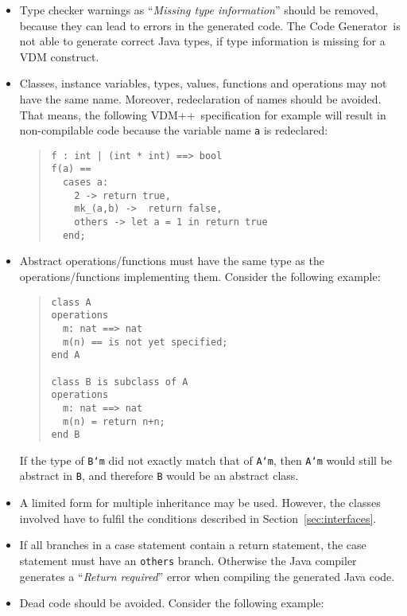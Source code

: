 \documentclass[\pformat,11pt]{article}
\newcommand{\Tcg}{The Code Generator}
\newcommand{\VDM}{VDM++}
\begin{document}
\begin{itemize}
\item Type checker warnings as ``{\em Missing type information}'' should
  be removed, because they can lead to errors in the generated code.
  \Tcg\ is not able to generate correct Java types, if type information is
  missing for a VDM construct.

\item Classes, instance variables, types, values, functions and operations may not have the same name.
Moreover, redeclaration of names should be avoided. That means, the following \VDM\ specification for example will result in non-compilable code because the variable name {\tt a} is redeclared:

\begin{quote}
\begin{small}
\begin{verbatim}
f : int | (int * int) ==> bool
f(a) ==
  cases a:
    2 -> return true,
    mk_(a,b) ->  return false,
    others -> let a = 1 in return true
  end;
\end{verbatim}
\end{small}
\end{quote}

\item Abstract operations/functions must have the same type as the
operations/functions implementing them. Consider the following example: 
\begin{quote}
\begin{small}
\begin{verbatim}
class A
operations
  m: nat ==> nat
  m(n) == is not yet specified;
end A

class B is subclass of A
operations
  m: nat ==> nat
  m(n) = return n+n;
end B
\end{verbatim}
\end{small}
\end{quote}
If the type of \texttt{B`m} did not exactly match that of
\texttt{A`m}, then \texttt{A`m} would still be abstract in \texttt{B},
and therefore \texttt{B} would be an abstract class.

\item A limited form for multiple inheritance may be used. However,
the classes involved have to fulfil the conditions described in
Section~\ref{sec:interfaces}.

\item If all branches in a case statement contain a return statement, the case statement must have an {\tt others} branch. Otherwise the Java compiler generates a  ``{\em Return required}'' error when compiling the generated Java code.
\item Dead code should be avoided. Consider the following example:


\end{itemize}
\end{document}
